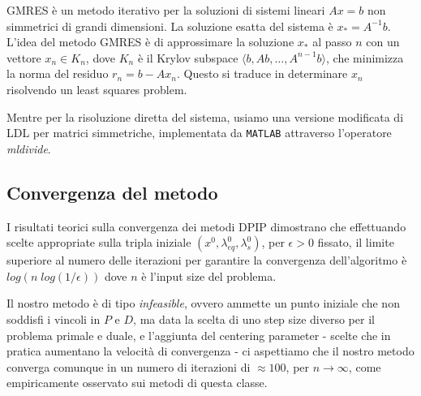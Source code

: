 GMRES è un metodo iterativo per la soluzioni di sistemi lineari $Ax=b$ non simmetrici di grandi dimensioni.
La soluzione esatta del sistema è $x_\ast = A^{-1}b$.
L'idea del metodo GMRES è di approssimare la soluzione $x_\ast$ al passo $n$ con un vettore $x_n \in K_n$, dove $K_n$ è il Krylov subspace $\langle b, Ab,\dots,A^{n-1}b\rangle$, che minimizza la norma del residuo $r_n = b - Ax_n$.
Questo si traduce in determinare $x_n$ risolvendo un least squares problem.

Mentre per la risoluzione diretta del sistema, usiamo una versione modificata di LDL per matrici simmetriche, implementata da \texttt{MATLAB} attraverso l'operatore \textit{mldivide}.


\subsection{Convergenza del metodo}\label{cap:Convergenza}

I risultati teorici sulla convergenza dei metodi DPIP \cite{Nocedal2006Numerical} dimostrano che effettuando scelte appropriate sulla tripla iniziale $(x^0, \lambda_{eq}^0, \lambda_s^0)$, per $\epsilon > 0$ fissato, il limite superiore al numero delle iterazioni per garantire la convergenza dell'algoritmo è $log(n\; log(1/\epsilon))$ dove $n$ è l'input size del problema.

Il nostro metodo è di tipo \textit{infeasible}, 
ovvero ammette un punto iniziale che non soddisfi i vincoli in $P$ e $D$, ma data la scelta di uno step size diverso per il problema primale e duale, e l'aggiunta del centering parameter - scelte che in pratica aumentano la velocità di convergenza - ci aspettiamo che il nostro metodo converga comunque in un numero di iterazioni di $\approx 100$, per $n \rightarrow \infty$, come empiricamente osservato sui metodi di questa classe.

